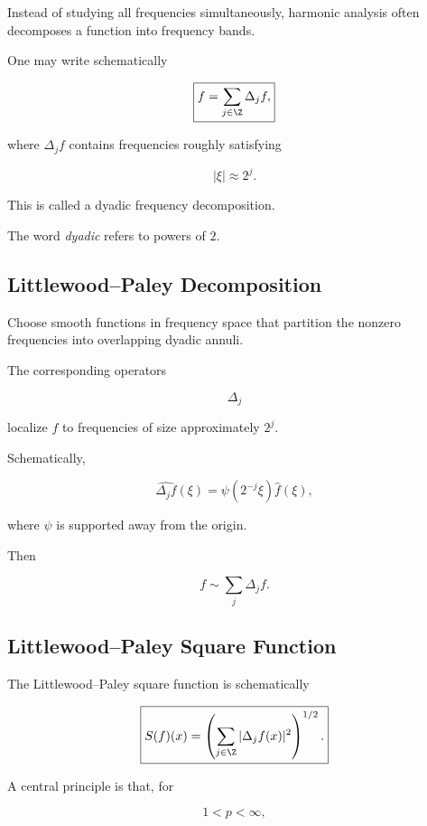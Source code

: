 Instead of studying all frequencies simultaneously, harmonic analysis
often decomposes a function into frequency bands.

One may write schematically

\[
\boxed{
f
=
\sum_{j\in\Z}
\Delta_jf,
}
\]

where \(\Delta_jf\) contains frequencies roughly satisfying

\[
\boxed{
|\xi|\approx2^j.
}
\]

This is called a dyadic frequency decomposition.

The word \emph{dyadic} refers to powers of \(2\).

\subsection{Littlewood--Paley Decomposition}
\label{subsec:littlewood-paley}

Choose smooth functions in frequency space that partition the nonzero
frequencies into overlapping dyadic annuli.

The corresponding operators

\[
\Delta_j
\]

localize \(f\) to frequencies of size approximately \(2^j\).

Schematically,

\[
\boxed{
\widehat{\Delta_jf}(\xi)
=
\psi(2^{-j}\xi)\widehat{f}(\xi),
}
\]

where \(\psi\) is supported away from the origin.

Then

\[
\boxed{
f
\sim
\sum_j\Delta_jf.
}
\]

\subsection{Littlewood--Paley Square Function}
\label{subsec:littlewood-paley-square}

The Littlewood--Paley square function is schematically

\[
\boxed{
S(f)(x)
=
\left(
\sum_{j\in\Z}
|\Delta_jf(x)|^2
\right)^{1/2}.
}
\]

A central principle is that, for

\[
1<p<\infty,
\]

